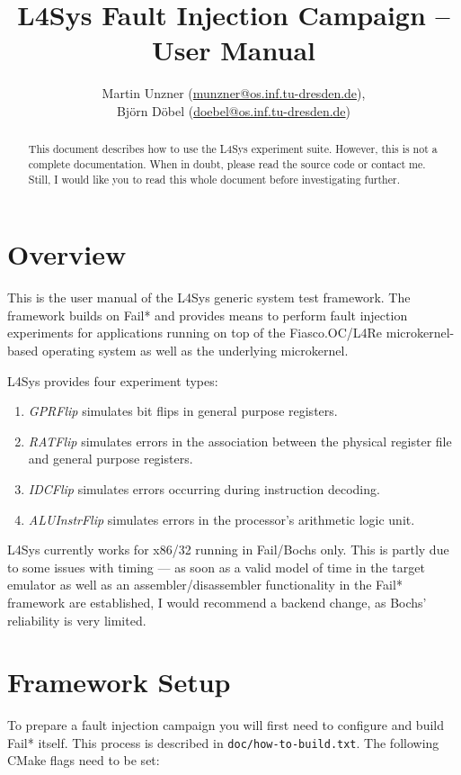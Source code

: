 \documentclass[a4paper,times,9pt]{article}
\title{L4Sys Fault Injection Campaign -- User Manual}
\author{Martin Unzner (\href{mailto:munzner@os.inf.tu-dresden.de}{munzner@os.inf.tu-dresden.de}), \\
        Björn Döbel (\href{mailto:doebel@os.inf.tu-dresden.de}{doebel@os.inf.tu-dresden.de})}
\newcommand{\lfs}{L4Sys}
\begin{document}
\maketitle

\begin{abstract}
This document describes how to use the L4Sys experiment suite.
However, this is not a complete documentation. When in doubt,
please read the source code or contact me. Still, I would like
you to read this whole document before investigating further.
\end{abstract}

\section{Overview}

This is the user manual of the \lfs{} generic system test framework.
The framework builds on Fail* and provides means to perform fault injection
experiments for applications running on top of the Fiasco.OC/L4Re
microkernel-based operating system as well as the underlying microkernel.

\noindent \lfs{} provides four experiment types:
\begin{enumerate}[topsep=0em,itemsep=0em]
  \item \emph{GPRFlip} simulates bit flips in general purpose registers.
  \item \emph{RATFlip} simulates errors in the association between the
        physical register file and general purpose registers.
  \item \emph{IDCFlip} simulates errors occurring during instruction decoding.
  \item \emph{ALUInstrFlip} simulates errors in the processor's arithmetic
        logic unit.
\end{enumerate}

\noindent \lfs{} currently works for x86/32 running in Fail/Bochs only.
This is partly due to some issues with timing --- as soon as a valid model of
time in the target emulator as well as an assembler/disassembler functionality
in the Fail* framework are established, I would recommend a backend change, as
Bochs' reliability is very limited.

\section{Framework Setup}

To prepare a fault injection campaign you will first need to configure and
build Fail* itself. This process is described in \texttt{doc/how-to-build.txt}.
The following CMake flags need to be set:
\end{document}
